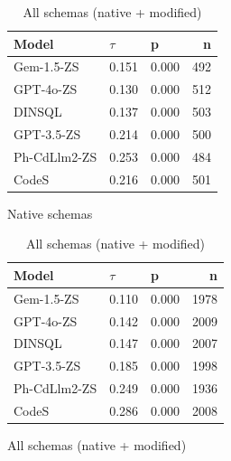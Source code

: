 \begin{table}
  \centering
  \caption{Kendall-Tau ($\tau$) Correlations between \emph{Query Combined Naturalness} and \emph{Query f1}.}
  \begin{subfigure}{.5\linewidth}
      \centering
      \caption{Native schemas}
      \begin{tabular}{lllr}
\toprule
Model & $\tau$ & p & n \\
\midrule
Gem-1.5-ZS & 0.151 & 0.000 & 492 \\
GPT-4o-ZS & 0.130 & 0.000 & 512 \\
DINSQL & 0.137 & 0.000 & 503 \\
GPT-3.5-ZS & 0.214 & 0.000 & 500 \\
Ph-CdLlm2-ZS & 0.253 & 0.000 & 484 \\
CodeS & 0.216 & 0.000 & 501 \\
\bottomrule
\end{tabular}

      \label{table:f1ktaunative}
  \end{subfigure}%
  \begin{subfigure}{.5\linewidth}
      \centering
      \caption{All schemas (native + modified)}
      \begin{tabular}{lllr}
\toprule
Model & $\tau$ & p & n \\
\midrule
Gem-1.5-ZS & 0.110 & 0.000 & 1978 \\
GPT-4o-ZS & 0.142 & 0.000 & 2009 \\
DINSQL & 0.147 & 0.000 & 2007 \\
GPT-3.5-ZS & 0.185 & 0.000 & 1998 \\
Ph-CdLlm2-ZS & 0.249 & 0.000 & 1936 \\
CodeS & 0.286 & 0.000 & 2008 \\
\bottomrule
\end{tabular}

      \label{table:f1ktauall}
  \end{subfigure}
  
\end{table}

